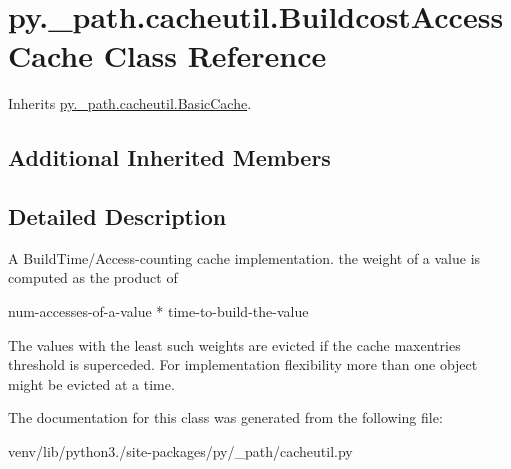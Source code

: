 \hypertarget{classpy_1_1__path_1_1cacheutil_1_1_buildcost_access_cache}{}\section{py.\+\_\+path.\+cacheutil.\+Buildcost\+Access\+Cache Class Reference}
\label{classpy_1_1__path_1_1cacheutil_1_1_buildcost_access_cache}


Inherits \hyperlink{classpy_1_1__path_1_1cacheutil_1_1_basic_cache}{py.\+\_\+path.\+cacheutil.\+Basic\+Cache}.

\subsection*{Additional Inherited Members}


\subsection{Detailed Description}
\begin{DoxyVerb}A BuildTime/Access-counting cache implementation.
    the weight of a value is computed as the product of

        num-accesses-of-a-value * time-to-build-the-value

    The values with the least such weights are evicted
    if the cache maxentries threshold is superceded.
    For implementation flexibility more than one object
    might be evicted at a time.
\end{DoxyVerb}
 

The documentation for this class was generated from the following file\+:\begin{DoxyCompactItemize}
\item 
venv/lib/python3./site-\/packages/py/\+\_\+path/cacheutil.\+py\end{DoxyCompactItemize}
